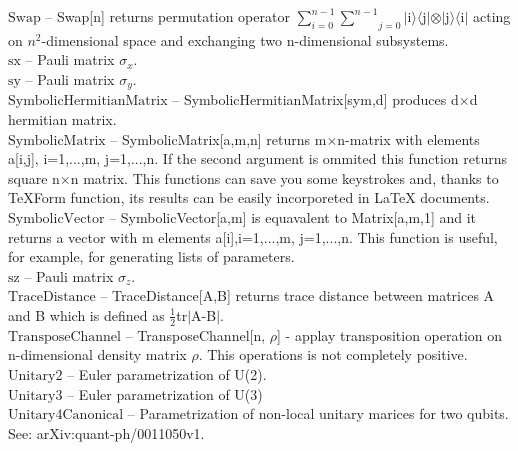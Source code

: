 \documentclass[a4paper,11pt]{article}
\begin{document}
\textbf{$ \text{Swap} $ }-- Swap[n] returns permutation operator $ \sum _{i=0}^{n-1} \underset{j=0}{\overset{n-1}{ \sum }} $$|$i$\rangle \langle $j$|\otimes |$j$\rangle \langle $i$|$ acting on $ n^2 $-dimensional space and exchanging two n-dimensional subsystems.$  $\\

\textbf{$ \text{sx} $ }-- Pauli matrix $ \sigma _x. $\\

\textbf{$ \text{sy} $ }-- Pauli matrix $ \sigma _y. $\\

\textbf{$ \text{SymbolicHermitianMatrix} $ }-- SymbolicHermitianMatrix[sym,d] produces d$\times $d hermitian matrix.$  $\\

\textbf{$ \text{SymbolicMatrix} $ }-- SymbolicMatrix[a,m,n] returns m$\times $n-matrix with elements a[i,j], i=1,...,m, j=1,...,n. If the second argument is ommited this function returns square n$\times $n matrix. This functions can save you some keystrokes and, thanks to TeXForm function, its results can be easily incorporeted in LaTeX documents.$  $\\

\textbf{$ \text{SymbolicVector} $ }-- SymbolicVector[a,m] is equavalent to Matrix[a,m,1] and it returns a vector with m elements a[i],i=1,...,m, j=1,...,n. This function is useful, for example, for generating lists of parameters.$  $\\

\textbf{$ \text{sz} $ }-- Pauli matrix $ \sigma _z. $\\

\textbf{$ \text{TraceDistance} $ }-- TraceDistance[A,B] returns trace distance between matrices A and B which is defined as $ \frac{1}{2} $tr$|$A-B$|$.$  $\\

\textbf{$ \text{TransposeChannel} $ }-- TransposeChannel[n, $\rho $] - applay transposition operation on n-dimensional density matrix $\rho $. This operations is not completely positive.$  $\\

\textbf{$ \text{Unitary2} $ }-- Euler parametrization of U(2).$  $\\

\textbf{$ \text{Unitary3} $ }-- Euler parametrization of U(3)$  $\\

\textbf{$ \text{Unitary4Canonical} $ }-- Parametrization of non-local unitary marices for two qubits. See: arXiv:quant-ph/0011050v1.$  $\\
\end{document}
